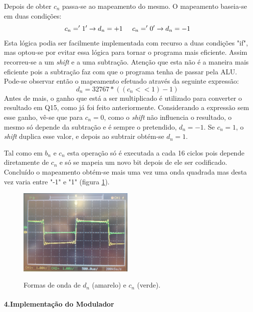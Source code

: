 \documentclass[11pt]{article}
\numberwithin{equation}{section}
\begin{document}
Depois de obter $ c_n $ passa-se ao mapeamento do mesmo. O mapeamento baseia-se em duas condições:
\begin{equation}
	c_n= '1' \rightarrow d_n =+1 \hspace{5 mm} c_n='0' \rightarrow d_n=-1
\end{equation}
Esta lógica podia ser facilmente implementada com recurso a duas condições "if", mas optou-se por evitar essa lógica para tornar o programa mais eficiente.
Assim recorreu-se a um \textit{shift} e a uma subtração. Atenção que esta não é a maneira mais eficiente pois a subtração faz com que o programa tenha de passar pela ALU.
Pode-se observar então o mapeamento efetuado através da seguinte expressão:
\begin{equation}
d_n=32767*((c_n << 1)-1)
\end{equation}
Antes de mais, o ganho que está a ser multiplicado é utilizado para converter o resultado em Q15, como já foi feito anteriormente. Considerando a expressão sem esse ganho, vê-se que para $ c_n=0 $, como o \textit{shift} não influencia o resultado, o mesmo só depende da subtração e é sempre o pretendido, $d_n=-1$. Se $c_n=1$, o \textit{shift} duplica  esse valor, e depois ao subtrair obtém-se $d_n=1$.

Tal como em $b_n$ e $c_n$ esta operação só é executada a cada 16 ciclos pois depende diretamente de $c_n$ e só se mapeia um novo bit depois de ele ser codificado. Concluído o mapeamento obtém-se mais uma vez uma onda quadrada mas desta vez varia entre "-1" e "1" (figura \ref{cn_dn}).
\begin{figure}[H]
	\centering
	\includegraphics[width=0.5\textwidth]{./cn_dn}~\\
	\caption{Formas de onda de $d_n$ (amarelo) e $c_n$ (verde).}
	\label{cn_dn}
\end{figure}

\paragraph{4.Implementação do Modulador} \hspace{0pt}
\end{document}
